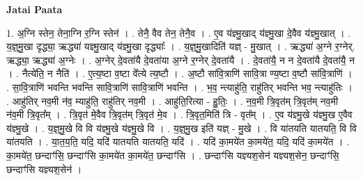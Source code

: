 \documentclass[17pt]{extarticle}
\begin{document}
\textbf{Jatai Paata} \newline

1. अ॒ग्नि स्तेन॒ तेना॒ग्नि र॒ग्नि स्तेन॑ । . तेनै॒ वैव तेन॒ तेनै॒व । . ए॒व य॑ज्ञ्मु॒खाद् य॑ज्ञ्मु॒खा दे॒वैव य॑ज्ञ्मु॒खात् । . य॒ज्ञ्॒मु॒खा दृद्ध्या॒ ऋद्ध्या॑ यज्ञ्मु॒खाद् य॑ज्ञ्मु॒खा दृद्ध्याः᳚ । . य॒ज्ञ्॒मु॒खादिति॑ यज्ञ् - मु॒खात् । . ऋद्ध्या॑ अ॒ग्ने र॒ग्नेर्. ऋद्ध्या॒ ऋद्ध्या॑ अ॒ग्नेः । . अ॒ग्नेर् दे॒वता॑यै दे॒वता॑या अ॒ग्ने र॒ग्नेर् दे॒वता॑यै । . दे॒वता॑यै॒ न न दे॒वता॑यै दे॒वता॑यै॒ न । . नैत्ये॑ति॒ न नैति॑ । . ए॒त्य॒ष्टा व॒ष्टा वे᳚त्ये त्य॒ष्टौ । . अ॒ष्टौ सा॑वि॒त्राणि॑ सावि॒त्रा ण्य॒ष्टा व॒ष्टौ सा॑वि॒त्राणि॑ । . सा॒वि॒त्राणि॑ भवन्ति भवन्ति सावि॒त्राणि॑ सावि॒त्राणि॑ भवन्ति । . भ॒व॒ न्त्याहु॑ति॒ राहु॑तिर् भवन्ति भव॒ न्त्याहु॑तिः । . आहु॑तिर् नव॒मी न॑व॒ म्याहु॑ति॒ राहु॑तिर् नव॒मी । . आहु॑ति॒रित्या - हु॒तिः॒ । . न॒व॒मी त्रि॒वृत॑म् त्रि॒वृत॑म् नव॒मी न॑व॒मी त्रि॒वृत᳚म् । . त्रि॒वृत॑ मे॒वैव त्रि॒वृत॑म् त्रि॒वृत॑ मे॒व । . त्रि॒वृत॒मिति॑ त्रि - वृत᳚म् । . ए॒व य॑ज्ञ्मु॒खे य॑ज्ञ्मु॒ख ए॒वैव य॑ज्ञ्मु॒खे । . य॒ज्ञ्॒मु॒खे वि वि य॑ज्ञ्मु॒खे य॑ज्ञ्मु॒खे वि । . य॒ज्ञ्॒मु॒ख इति॑ यज्ञ् - मु॒खे । . वि या॑तयति यातयति॒ वि वि या॑तयति । . या॒त॒य॒ति॒ यदि॒ यदि॑ यातयति यातयति॒ यदि॑ । . यदि॑ का॒मये॑त का॒मये॑त॒ यदि॒ यदि॑ का॒मये॑त । . का॒मये॑त॒ छन्दाꣳ॑सि॒ छन्दाꣳ॑सि का॒मये॑त का॒मये॑त॒ छन्दाꣳ॑सि । . छन्दाꣳ॑सि यज्ञ्यश॒सेन॑ यज्ञ्यश॒सेन॒ छन्दाꣳ॑सि॒ छन्दाꣳ॑सि यज्ञ्यश॒सेन॑ । \newline
\end{document}
